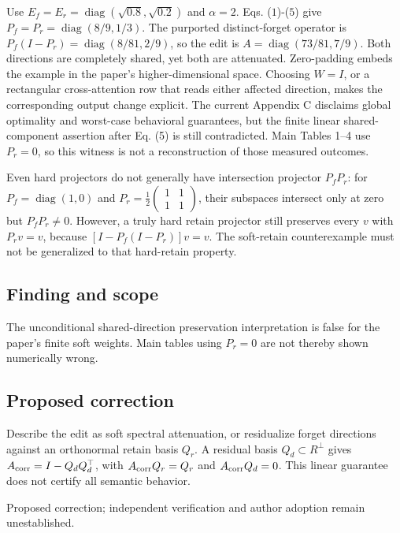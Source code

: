 \documentclass[11pt]{article}
\begin{document}
Use \(E_f=E_r=\operatorname{diag}(\sqrt{0.8},\sqrt{0.2})\) and \(\alpha=2\). Eqs. (\(1\))-(\(5\)) give \(P_f=P_r=\operatorname{diag}(8/9,1/3)\). The purported distinct-forget operator is \(P_f(I-P_r)=\operatorname{diag}(8/81,2/9)\), so the edit is \(A=\operatorname{diag}(73/81,7/9)\). Both directions are completely shared, yet both are attenuated. Zero-padding embeds the example in the paper's higher-dimensional space. Choosing \(W=I\), or a rectangular cross-attention row that reads either affected direction, makes the corresponding output change explicit. The current Appendix C disclaims global optimality and worst-case behavioral guarantees, but the finite linear shared-component assertion after Eq. (5) is still contradicted. Main Tables 1–4 use \(P_r=0\), so this witness is not a reconstruction of those measured outcomes.

Even hard projectors do not generally have intersection projector \(P_fP_r\): for \(P_f=\operatorname{diag}(1,0)\) and \(P_r=\frac12\begin{pmatrix}1&1\\1&1\end{pmatrix}\), their subspaces intersect only at zero but \(P_fP_r\ne0\). However, a truly hard retain projector still preserves every \(v\) with \(P_rv=v\), because \([I-P_f(I-P_r)]v=v\). The soft-retain counterexample must not be generalized to that hard-retain property.

\subsection*{Finding and scope}

The unconditional shared-direction preservation interpretation is false for the paper's finite soft weights. Main tables using \(P_r=0\) are not thereby shown numerically wrong.

\subsection*{Proposed correction}

Describe the edit as soft spectral attenuation, or residualize forget directions against an orthonormal retain basis \(Q_r\). A residual basis \(Q_d\subset R^\perp\) gives \(A_{\rm corr}=I-Q_dQ_d^\top\), with \(A_{\rm corr}Q_r=Q_r\) and \(A_{\rm corr}Q_d=0\). This linear guarantee does not certify all semantic behavior.

Proposed correction; independent verification and author adoption remain unestablished.
\end{document}
